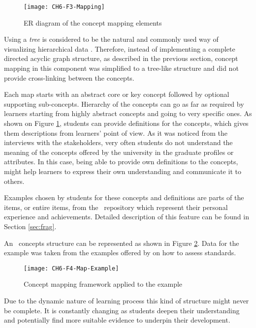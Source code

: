 \begin{figure}[htb]
\centering
\texttt{[image: CH6-F3-Mapping]}
\caption{ER diagram of the concept mapping elements}
\label{fig:mapping}
\end{figure}

Using a \textit{tree} is considered to be the natural and commonly used way of
visualizing hierarchical data \citep{Gorg2007,Holten2006}. Therefore, instead of
implementing a complete directed acyclic graph structure, as described in the
previous section, concept mapping in this component was simplified to a
tree-like structure and did not provide cross-linking between the concepts.

Each map starts with an abstract core or key concept followed by optional
supporting sub-concepts. Hierarchy of the concepts can go as far as required by
learners starting from highly abstract concepts and going to very specific ones.
As shown on Figure \ref{fig:mapping}, students can provide definitions for the
concepts, which gives them descriptions from learners' point of view. As it was
noticed from the interviews with the stakeholders, very often students do not
understand the meaning of the concepts offered by the university in the graduate
profiles or attributes. In this case, being able to provide own definitions to
the concepts, might help learners to express their own understanding and
communicate it to others.

Examples chosen by students for these concepts and definitions are parts of the
items, or entire items, from the \ep~repository which represent their personal
experience and achievements. Detailed description of this feature can be found
in Section \ref{sec:frag}.

An \ep~concepts structure can be represented as shown in Figure \ref{fig:mapex}.
Data for the example was taken from the examples offered by \citet{Marzano1993}
on how to assess \LLLs standards.
 
\begin{figure}[htb]
\centering
\texttt{[image: CH6-F4-Map-Example]}
\caption{Concept mapping framework applied to the example}
\label{fig:mapex} 
\end{figure}

Due to the dynamic nature of learning process this kind of structure might never
be complete. It is constantly changing as students deepen their understanding
and potentially find more suitable evidence to underpin their development.

